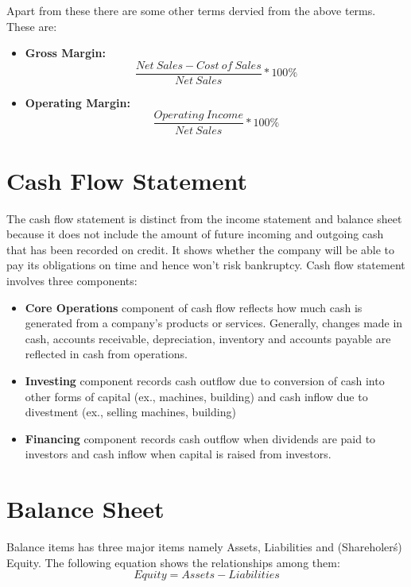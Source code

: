 Apart from these there are some other terms dervied from the above terms. These are:
\begin{itemize}
\item\textbf{Gross Margin:} $$ \frac{Net\: Sales - Cost\: of\: Sales}{Net\: Sales} * 100\%$$
\item\textbf{Operating Margin:} $$\frac{Operating\: Income}{Net\: Sales}*100\%$$
\end{itemize}

\section{Cash Flow Statement}
The cash flow statement is distinct from the income statement and balance sheet because it does not include the amount of future incoming and outgoing cash that has been recorded on credit. It shows whether the company will be able to pay its obligations on time and hence won’t risk bankruptcy. Cash flow statement involves three components:

\begin{itemize}
\item \textbf{Core Operations} component of cash flow reflects how much cash is generated from a company's products or services. Generally, changes made in cash, accounts receivable, depreciation, inventory and accounts payable are reflected in cash from operations.
\item \textbf{Investing} component records cash outflow due to conversion of cash into other forms of capital (ex., machines, building) and cash inflow due to divestment (ex., selling machines, building)
\item \textbf{Financing} component records cash outflow when dividends are paid to investors and cash inflow when capital is raised from investors.
\end{itemize}

\section{Balance Sheet}
Balance items has three major items namely Assets, Liabilities and (Shareholer\'s) Equity. The following equation shows the relationships among them: 
$$Equity = Assets - Liabilities$$

